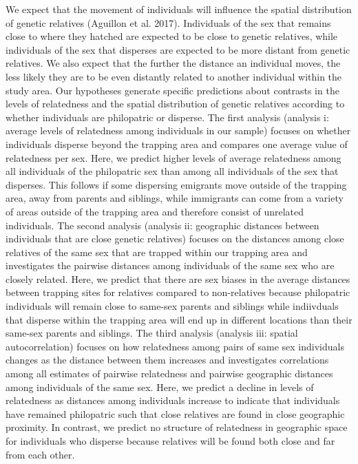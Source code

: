\documentclass[
]{article}
\begin{document}
We expect that the movement of individuals will influence the spatial
distribution of genetic relatives (Aguillon et al. 2017). Individuals of
the sex that remains close to where they hatched are expected to be
close to genetic relatives, while individuals of the sex that disperses
are expected to be more distant from genetic relatives. We also expect
that the further the distance an individual moves, the less likely they
are to be even distantly related to another individual within the study
area. Our hypotheses generate specific predictions about contrasts in
the levels of relatedness and the spatial distribution of genetic
relatives according to whether individuals are philopatric or disperse.
The first analysis (analysis i: average levels of relatedness among
individuals in our sample) focuses on whether individuals disperse
beyond the trapping area and compares one average value of relatedness
per sex. Here, we predict higher levels of average relatedness among all
individuals of the philopatric sex than among all individuals of the sex
that disperses. This follows if some dispersing emigrants move outside
of the trapping area, away from parents and siblings, while immigrants
can come from a variety of areas outside of the trapping area and
therefore consist of unrelated individuals. The second analysis
(analysis ii: geographic distances between individuals that are close
genetic relatives) focuses on the distances among close relatives of the
same sex that are trapped within our trapping area and investigates the
pairwise distances among individuals of the same sex who are closely
related. Here, we predict that there are sex biases in the average
distances between trapping sites for relatives compared to non-relatives
because philopatric individuals will remain close to same-sex parents
and siblings while indiivduals that disperse within the trapping area
will end up in different locations than their same-sex parents and
siblings. The third analysis (analysis iii: spatial autocorrelation)
focuses on how relatedness among pairs of same sex individuals changes
as the distance between them increases and investigates correlations
among all estimates of pairwise relatedness and pairwise geographic
distances among individuals of the same sex. Here, we predict a decline
in levels of relatedness as distances among individuals increase to
indicate that individuals have remained philopatric such that close
relatives are found in close geographic proximity. In contrast, we
predict no structure of relatedness in geographic space for individuals
who disperse because relatives will be found both close and far from
each other.
\end{document}

